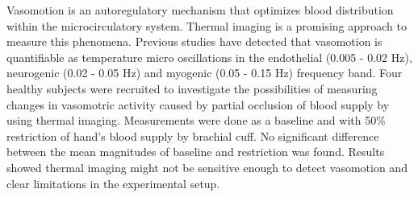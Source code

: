 Vasomotion is an autoregulatory mechanism that optimizes blood distribution within the microcirculatory system. Thermal imaging is a promising approach to measure this phenomena.	
Previous studies have detected that vasomotion is quantifiable as temperature micro oscillations in the endothelial (0.005 - 0.02 Hz), neurogenic (0.02 - 0.05 Hz) and myogenic (0.05 - 0.15 Hz) frequency band. Four healthy subjects were recruited to investigate the possibilities of measuring changes in vasomotric activity caused by partial occlusion of blood supply by using thermal imaging.
Measurements were done as a baseline and with 50\% restriction of hand$’$s blood supply by brachial cuff.
No significant difference between the mean magnitudes of baseline and restriction was found. 
Results showed thermal imaging might not be sensitive enough to detect vasomotion and clear limitations in the experimental setup.